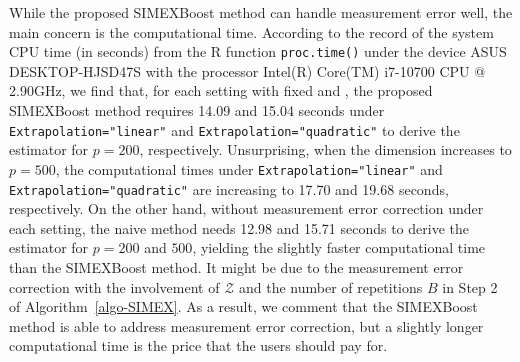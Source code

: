 While the proposed SIMEXBoost method {can handle measurement error well}, the main concern is the computational time. According to the record of the system CPU time (in seconds) from the R function \texttt{proc.time()} under the device ASUS DESKTOP-HJSD47S with the processor Intel(R) Core(TM) i7-10700 CPU @ 2.90GHz, we find that, for each setting with fixed  and , the proposed SIMEXBoost method requires 14.09 and 15.04 seconds under \texttt{Extrapolation="linear"} and \texttt{Extrapolation="quadratic"} to derive the estimator for $p=200$, respectively. Unsurprising, when the dimension increases to $p=500$, the computational times under \texttt{Extrapolation="linear"} and \texttt{Extrapolation="quadratic"} are increasing to 17.70 and 19.68 seconds, respectively. On the other hand, without measurement error correction under each setting, the naive method needs 12.98 and 15.71 seconds to derive the estimator for $p=200$ and $500$, yielding the slightly faster computational time than the SIMEXBoost method. It might be due to the measurement error correction with the involvement of $\mathcal{Z}$ and the number of repetitions $B$ in Step 2 of Algorithm~\ref{algo-SIMEX}. As a result, we comment that the SIMEXBoost method is able to address measurement error correction, but a slightly longer computational time is the price that the users should pay for.


